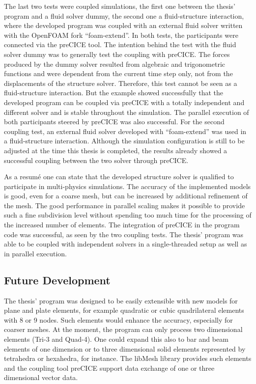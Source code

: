   The last two tests were coupled simulations, the first one between the thesis' program and a fluid solver dummy, the second one a fluid-structure interaction, where the developed program was coupled with an external fluid solver written with the OpenFOAM fork ``foam-extend''. In both tests, the participants were connected via the preCICE tool. The intention behind the test with the fluid solver dummy was to generally test the coupling with preCICE. The forces produced by the dummy solver resulted from algebraic and trigonometric functions and were dependent from the current time step only, not from the displacements of the structure solver. Therefore, this test cannot be seen as a fluid-structure interaction. But the example showed successfully that the developed program can be coupled via preCICE with a totally independent and different solver and is stable throughout the simulation. The parallel execution of both participants steered by preCICE was also successful. For the second coupling test, an external fluid solver developed with ``foam-extend'' was used in a fluid-structure interaction. Although the simulation configuration is still to be adjusted at the time this thesis is completed, the results already showed a successful coupling between the two solver through preCICE.

  As a resum\'{e} one can state that the developed structure solver is qualified to participate in multi-physics simulations. The accuracy of the implemented models is good, even for a coarse mesh, but can be increased by additional refinement of the mesh. The good performance in parallel scaling makes it possible to provide such a fine subdivision level without spending too much time for the processing of the increased number of elements. The integration of preCICE in the program code was successful, as seen by the two coupling tests. The thesis' program was able to be coupled with independent solvers in a single-threaded setup as well as in parallel execution.

 \subsection{Future Development}
  The thesis' program was designed to be easily extensible with new models for plane and plate elements, for example quadratic or cubic quadrilateral elements with 8 or 9 nodes. Such elements would enhance the accuracy, especially for coarser meshes. At the moment, the program can only process two dimensional elements (Tri-3 and Quad-4). One could expand this also to bar and beam elements of one dimension or to three dimensional solid elements represented by tetrahedra or hexahedra, for instance. The libMesh library provides such elements and the coupling tool preCICE support data exchange of one or three dimensional vector data.
  
